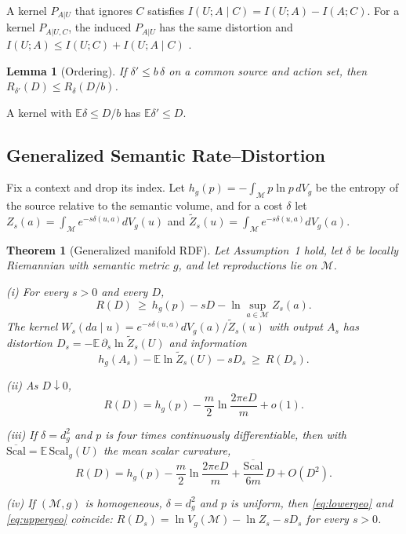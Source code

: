 \documentclass[10pt,journal]{IEEEtran}
\newtheorem{theorem}{Theorem}
\newtheorem{lemma}{Lemma}
\newcommand{\E}{\mathbb E}
\newcommand{\M}{\mathcal M}
\begin{document}
\begin{IEEEproof}
A kernel $P_{A|U}$ that ignores $C$ satisfies $I(U;A\mid C)=I(U;A)-I(A;C)$. For a kernel $P_{A|U,C}$, the induced $P_{A|U}$ has the same distortion and $I(U;A)\le I(U;C)+I(U;A\mid C)$ \cite{gray1973new}.
\end{IEEEproof}
\begin{lemma}[Ordering]\label{lem:order}
If $\delta'\le b\,\delta$ on a common source and action set, then $R_{\delta'}(D)\le R_\delta(D/b)$.
\end{lemma}
\begin{IEEEproof}
A kernel with $\E\delta\le D/b$ has $\E\delta'\le D$.
\end{IEEEproof}

\subsection{Generalized Semantic Rate--Distortion}
Fix a context and drop its index. Let $h_g(p)=-\int_\M p\ln p\,dV_g$ be the entropy of the source relative to the semantic volume, and for a cost $\delta$ let $Z_s(a)=\int_\M e^{-s\delta(u,a)}dV_g(u)$ and $\tilde Z_s(u)=\int_\M e^{-s\delta(u,a)}dV_g(a)$.
\begin{theorem}[Generalized manifold RDF]\label{thm:intrinsic}
Let Assumption~1 hold, let $\delta$ be locally Riemannian with semantic metric $g$, and let reproductions lie on $\M$.

(i) For every $s>0$ and every $D$,
\begin{equation}
 R(D)\ \ge\ h_g(p)-sD-\ln\sup_{a\in\M}Z_s(a). \label{eq:lowergeo}
\end{equation}
The kernel $W_s(da\mid u)=e^{-s\delta(u,a)}dV_g(a)/\tilde Z_s(u)$ with output $A_s$ has distortion $D_s=-\E\,\partial_s\ln\tilde Z_s(U)$ and information
\begin{equation}
 h_g(A_s)-\E\ln\tilde Z_s(U)-sD_s\ \ge\ R(D_s). \label{eq:uppergeo}
\end{equation}

(ii) As $D\downarrow0$,
\begin{equation}
 R(D)=h_g(p)-\frac m2\ln\frac{2\pi eD}{m}+o(1). \label{eq:highres}
\end{equation}

(iii) If $\delta=d_g^2$ and $p$ is four times continuously differentiable, then with $\overline{\mathrm{Scal}}=\E\,\mathrm{Scal}_g(U)$ the mean scalar curvature,
\begin{equation}
 R(D)=h_g(p)-\frac m2\ln\frac{2\pi eD}{m}+\frac{\overline{\mathrm{Scal}}}{6m}\,D+O(D^2). \label{eq:curv}
\end{equation}

(iv) If $(\M,g)$ is homogeneous, $\delta=d_g^2$ and $p$ is uniform, then \eqref{eq:lowergeo} and \eqref{eq:uppergeo} coincide: $R(D_s)=\ln V_g(\M)-\ln Z_s-sD_s$ for every $s>0$.
\end{theorem}
\end{document}
